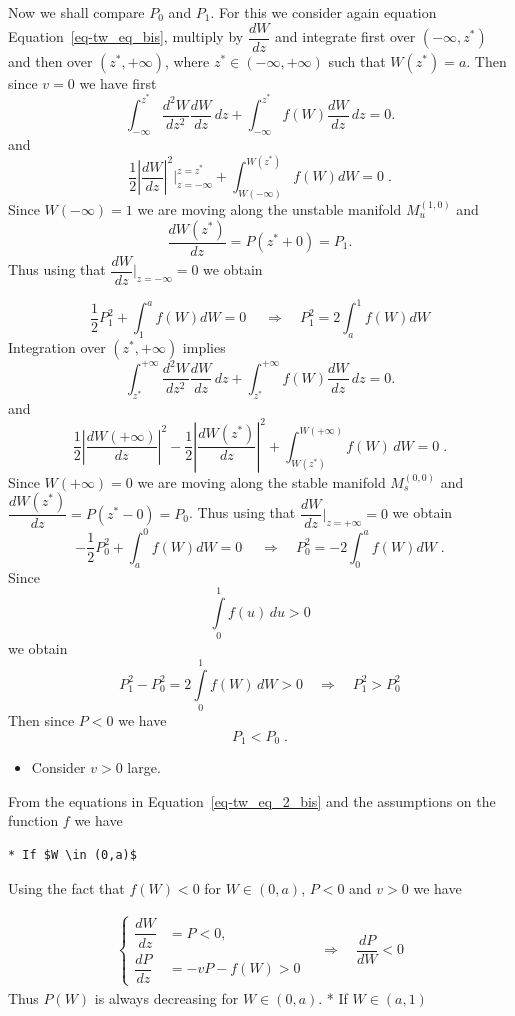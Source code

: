 \documentclass[
  letterpaper,
  DIV=11,
  numbers=noendperiod]{scrreprt}
\providecommand{\tightlist}{%
  \setlength{\itemsep}{0pt}\setlength{\parskip}{0pt}}\usepackage{longtable,booktabs,array}
\theoremstyle{plain}
\theoremstyle{definition}
\theoremstyle{plain}
\theoremstyle{remark}
\begin{document}
Now we shall compare \(P_0\) and \(P_1\). For this we consider again
equation Equation~\ref{eq-tw_eq_bis}, multiply by \(\dfrac{dW}{dz}\) and
integrate first over \((-\infty, z^\ast)\) and then over
\((z^\ast, + \infty)\), where \(z^\ast \in (-\infty, + \infty)\) such
that \(W(z^\ast)=a\). Then since \(v=0\) we have first \[    
    \int_{-\infty}^{z^\ast}  \dfrac{d^2W}{dz^2} \dfrac{dW}{dz} \, dz   + \int_{-\infty}^{z^\ast}f(W)\dfrac{dW}{dz} \, dz =0.
\] and \[
    \frac 12\left|\dfrac{dW}{dz}\right|^2 \Big|_{z=-\infty}^{z=z^\ast}  + \int_{W(-\infty)}^{W(z^\ast)}f(W) dW=0 \; .
\] Since \(W(-\infty) =1\) we are moving along the unstable manifold
\(M_u^{(1,0)}\) and \[
\dfrac{dW(z^\ast)}{dz}=P(z^\ast+ 0) = P_1.
\] Thus using that \(\dfrac{dW}{dz}\Big|_{z= - \infty} =0\) we obtain

\[
    \frac 12 P^2_1  + \int_{1}^{a}f(W) dW=0 \; \quad  \Longrightarrow \quad  P_1^2 = 2 \int_{a}^{1}f(W) dW
\] Integration over \((z^\ast, + \infty)\) implies \[
\int_{z^\ast}^{+ \infty}  \dfrac{d^2W}{dz^2} \dfrac{dW}{dz} \, dz   + \int_{z^\ast}^{+ \infty} f(W)\dfrac{dW}{dz} \, dz =0.
\] and \[
    \frac 12 \left|\dfrac{dW(+ \infty)}{dz}\right|^2 -  \frac 12 \left|\dfrac{dW(z^\ast)}{dz}\right|^2  + \int_{W(z^\ast)}^{W(+ \infty)} f(W) \, dW =0 \; .
\] Since \(W(+\infty) =0\) we are moving along the stable manifold
\(M_s^{(0,0)}\) and \(\dfrac{dW(z^\ast)}{dz}=P(z^\ast- 0) = P_0\). Thus
using that \(\dfrac{dW}{dz}\Big|_{z= + \infty} =0\) we obtain \[
    -\frac 12 P^2_0  + \int_{a}^{0}f(W) dW=0 \;  \quad  \Longrightarrow \quad  P_0^2 = - 2 \int_{0}^{a}f(W) dW\; .
\] Since \[
\int\limits_{0}^{1}f(u) \, du > 0
\] we obtain \[
P^2_1 - P_0^2=2 \int\limits_{0}^{1}f(W) \, dW > 0   \quad  \Longrightarrow \quad P^2_1 > P_0^2
\] Then since \(P<0\) we have \[
P_1 < P_0 \; .
\]

\begin{itemize}
\tightlist
\item
  Consider \(v>0\) large.
\end{itemize}

From the equations in Equation~\ref{eq-tw_eq_2_bis} and the assumptions
on the function \(f\) we have

\begin{verbatim}
* If $W \in (0,a)$
\end{verbatim}

Using the fact that \(f(W) <0\) for \(W \in (0,a)\), \(P<0\) and \(v>0\)
we have

\[
\begin{aligned}
\begin{cases}
\dfrac{dW}{dz} &= P <0, \\
\dfrac{dP}{dz} &= -vP- f(W) >0
\end{cases}  \quad  \Longrightarrow \quad \dfrac{dP}{dW} <0
\end{aligned}
\] Thus \(P(W)\) is always decreasing for \(W \in (0,a)\). * If
\(W \in (a,1)\)
\end{document}
